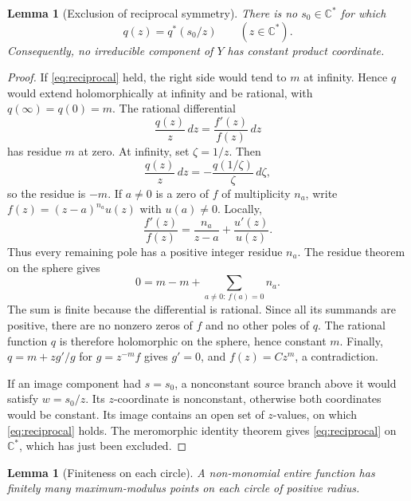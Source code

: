 \documentclass[11pt,reqno]{amsart}
\newtheorem{lemma}[theorem]{Lemma}
\theoremstyle{remark}
\numberwithin{equation}{section}
\newcommand{\C}{\mathbb C}
\newcommand{\Cs}{\C^*}
\begin{document}
\begin{lemma}[Exclusion of reciprocal symmetry]\label{lem:reciprocal}
There is no $s_0\in\Cs$ for which
\begin{equation}\label{eq:reciprocal}
 q(z)=q^*(s_0/z)\qquad(z\in\Cs).
\end{equation}
Consequently, no irreducible component of $Y$ has constant product
coordinate.
\end{lemma}

\begin{proof}
If \eqref{eq:reciprocal} held, the right side would tend to $m$ at
infinity. Hence $q$ would extend holomorphically at infinity and be
rational, with $q(\infty)=q(0)=m$.
The rational differential
\[
 \frac{q(z)}z\,dz=\frac{f'(z)}{f(z)}\,dz
\]
has residue $m$ at zero. At infinity, set $\zeta=1/z$. Then
\[
 \frac{q(z)}{z}\,dz=-\frac{q(1/\zeta)}{\zeta}\,d\zeta,
\]
so the residue is $-m$. If $a\ne0$ is a zero of $f$ of
multiplicity $n_a$, write $f(z)=(z-a)^{n_a}u(z)$ with
$u(a)\ne0$. Locally,
\[
 \frac{f'(z)}{f(z)}
 =\frac{n_a}{z-a}+\frac{u'(z)}{u(z)}.
\]
Thus every remaining pole has a positive integer residue $n_a$.
The residue theorem on the sphere gives
\[
 0=m-m+\sum_{a\ne0:\,f(a)=0}n_a.
\]
The sum is finite because the differential is rational. Since
all its summands are positive, there are no nonzero zeros of
$f$ and no other poles of $q$. The rational function $q$ is
therefore holomorphic on the sphere, hence constant $m$.
Finally, $q=m+zg'/g$ for $g=z^{-m}f$ gives $g'=0$, and
$f(z)=Cz^m$, a contradiction.

If an image component had $s=s_0$, a nonconstant source branch above
it would satisfy $w=s_0/z$. Its $z$-coordinate is nonconstant,
otherwise both coordinates would be constant. Its image contains an
open set of $z$-values, on which \eqref{eq:reciprocal} holds. The
meromorphic identity theorem gives \eqref{eq:reciprocal} on $\Cs$,
which has just been excluded.
\end{proof}

\begin{lemma}[Finiteness on each circle]\label{lem:finite-maxima}
A non-monomial entire function has finitely many maximum-modulus
points on each circle of positive radius.
\end{lemma}
\end{document}
